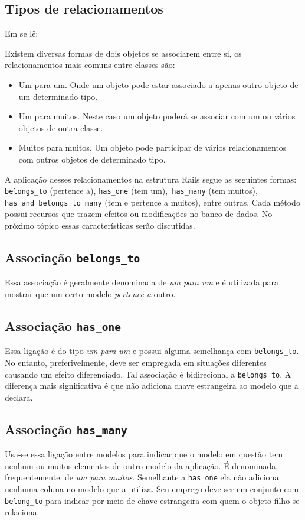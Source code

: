 \subsection{Tipos de relacionamentos}
Em \cite{relacionamentos2015} se lê:
\begin{citacao}
	
Existem diversas formas de dois objetos se associarem entre si, os relacionamentos mais comuns entre classes são:
\begin{itemize}

	\item Um para um. Onde um objeto pode estar associado a apenas outro objeto de um determinado tipo.
	\item Um para muitos. Neste caso um objeto poderá se associar com um ou vários objetos de outra classe.
	\item Muitos para muitos. Um objeto pode participar de vários relacionamentos com outros objetos de determinado tipo.
\end{itemize}
\end{citacao}

A aplicação desses relacionamentos na estrutura Rails segue as seguintes formas: \texttt{belongs\_to} (pertence a), \texttt{has\_one} (tem um),\texttt{ has\_many} (tem muitos), \texttt{has\_and\_belongs\_to\_many} (tem e pertence a muitos), entre outras. Cada  método possui recursos que trazem efeitos ou modificações no banco de dados. No próximo tópico essas características serão discutidas.


\subsection{Associação \texttt{belongs\_to}}
Essa associação é geralmente denominada de \textit{um para um} e é utilizada para mostrar que um certo modelo \textit{pertence a} outro.

\subsection{Associação \texttt{has\_one}}
Essa ligação é do tipo \textit{um para um} e possui alguma semelhança com  \texttt{belongs\_to}. No entanto, preferivelmente, deve ser empregada em situações diferentes causando um efeito diferenciado. Tal associação é bidirecional a \texttt{belongs\_to}. A diferença mais significativa  é que não adiciona chave estrangeira ao modelo que a declara. 

\subsection{Associação \texttt{has\_many}}
Usa-se essa ligação entre modelos para indicar que o modelo em questão tem nenhum ou muitos elementos de outro modelo da aplicação. É denominada, frequentemente, de \textit{um para muitos}. Semelhante a \texttt{has\_one} ela não adiciona nenhuma coluna no modelo que a utiliza. Seu emprego deve ser em conjunto com \texttt{belong\_to} para indicar por meio de chave estrangeira com quem o objeto filho se relaciona. 

